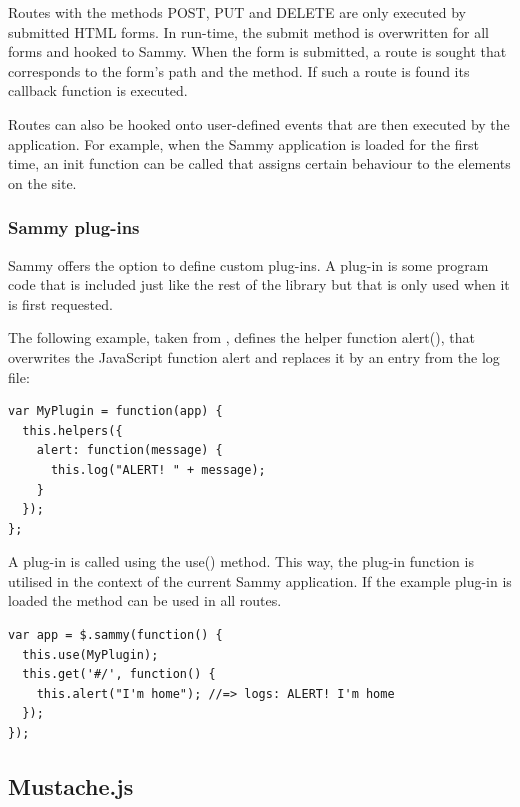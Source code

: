 Routes with the methods {\selectfont POST}, {\selectfont PUT} and {\selectfont DELETE} are only executed by submitted HTML forms. In run-time, the {\selectfont submit} method is overwritten for all forms and hooked to Sammy. When the form is submitted, a route is sought that corresponds to the form's path and the method. If such a route is found its callback function is executed.

Routes can also be hooked onto user-defined events that are then executed by the application. For example, when the Sammy application is loaded for the first time, an {\selectfont init} function can be called that assigns certain behaviour to the elements on the site.


\subsubsection{Sammy plug-ins}

Sammy offers the option to define custom plug-ins. A plug-in is some program code that is included just like the rest of the library but that is only used when it is first requested.

The following example, taken from \cite{sammy:plugins}, defines the helper function {\selectfont alert()}, that overwrites the JavaScript function {\selectfont alert} and replaces it by an entry from the log file:

\medskip
\begin{lstlisting}[caption=Sammy.js: example of a plug-in]
var MyPlugin = function(app) {
  this.helpers({
    alert: function(message) {
      this.log("ALERT! " + message);
    }
  });
};
\end{lstlisting}

A plug-in is called using the {\selectfont use()} method. This way, the plug-in function is utilised in the context of the current Sammy application. If the example plug-in is loaded the method can be used in all routes.

\medskip
\begin{lstlisting}[caption=Sammy.js: including a plug-in]
var app = $.sammy(function() {
  this.use(MyPlugin);
  this.get('#/', function() {
    this.alert("I'm home"); //=> logs: ALERT! I'm home
  });
});
\end{lstlisting}


\subsection{Mustache.js}
\label{subsec:mustache}

